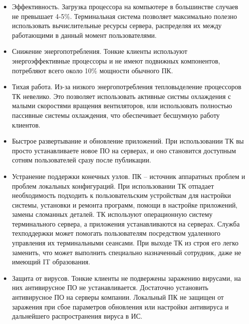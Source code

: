 \begin{itemize}
    \item   Эффективность. Загрузка процессора на компьютере в большинстве случаев не
        превышает 4-5\%. Терминальная система позволяет максимально полезно использовать
        вычислительные ресурсы сервера, распределяя их между работающими в данный момент
        пользователями.
    \item   Снижение энергопотребления. Тонкие клиенты используют
        энергоэффективные процессоры и не имеют подвижных компонентов, потребляют всего
        около 10\% мощности обычного ПК.
    \item   Тихая работа. Из-за низкого энергопотребления тепловыделение процессоров ТК
        невелико. Это позволяет использовать активные систмы охлаждения с малыми
        скоростями вращения вентиляторов, или использовать полностью пассивные системы
        охлаждения, что обеспечивает бесшумную работу клиентов.
    \item   Быстрое развертывание и обновление приложений. При использовании ТК вы
        просто устанавливаете новое ПО на серверах, и оно становится доступным сотням
        пользователей сразу после публикации.
    \item   Устранение поддержки конечных узлов. ПК – источник аппаратных проблем и
        проблем локальных конфигураций. При использовании ТК отпадает необходимость
        подходить к пользовательским устройствам для настройки системы, установки и
        ремонта программ, помощи в настройке приложений, замены сломанных деталей. ТК
        используют операционную систему терминального сервера, а приложения
        устанавливаются на серверах. Служба техподдержки может помогать пользователям
        посредством удаленного управления их терминальными сеансами. При выходе ТК из
        строя его легко заменить, что может выполнить специально назначенный сотрудник,
        даже не имеющий IT образования.
    \item   Защита от вирусов. Тонкие клиенты не подвержены заражению вирусами, на них
        антивирусное ПО не устанавливается. Достаточно установить антивирусное ПО на
        серверы компании. Локальный ПК не защищен от заражения при сбое параметров
        обновления или настройки антивируса и дальнейшего распространения вируса в ИС.
\end{itemize}

